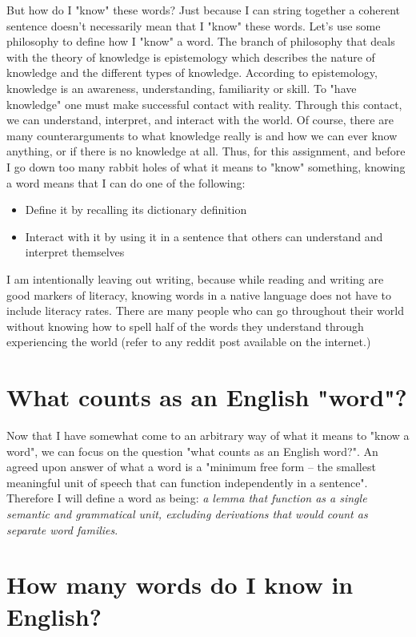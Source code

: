 \documentclass[11pt]{article}
\begin{document}
But how do I "know" these words? Just because I can string together a coherent sentence doesn't necessarily mean that I "know" these words. Let's use some philosophy to define how I "know" a word. The branch of philosophy that deals with the theory of knowledge is epistemology which describes the nature of knowledge and the different types of knowledge. According to epistemology, knowledge is an awareness, understanding, familiarity or skill. To "have knowledge" one must make successful contact with reality. Through this contact, we can understand, interpret, and interact with the world. Of course, there are many counterarguments to what knowledge really is and how we can ever know anything, or if there is no knowledge at all. Thus, for this assignment, and before I go down too many rabbit holes of what it means to "know" something, knowing a word means that I can do one of the following:


\begin{itemize}
  \item Define it by recalling its dictionary definition
  \item Interact with it by using it in a sentence that others can understand and interpret themselves
\end{itemize}

I am intentionally leaving out writing, because while reading and writing are good markers of literacy, knowing words in a native language does not have to include literacy rates. There are many people who can go throughout their world without knowing how to spell half of the words they understand through experiencing the world (refer to any reddit post available on the internet.)

\section{What counts as an English "word"?}

Now that I have somewhat come to an arbitrary way of what it means to "know a word", we can focus on the question "what counts as an English word?". An agreed upon answer of what a word is a "minimum free form -- the smallest meaningful unit of speech that can function independently in a sentence". Therefore I will define a word as being: \textit{a lemma that function as a single semantic and grammatical unit, excluding derivations that would count as separate word families}.


\section{How many words do I know in English?}
\end{document}
